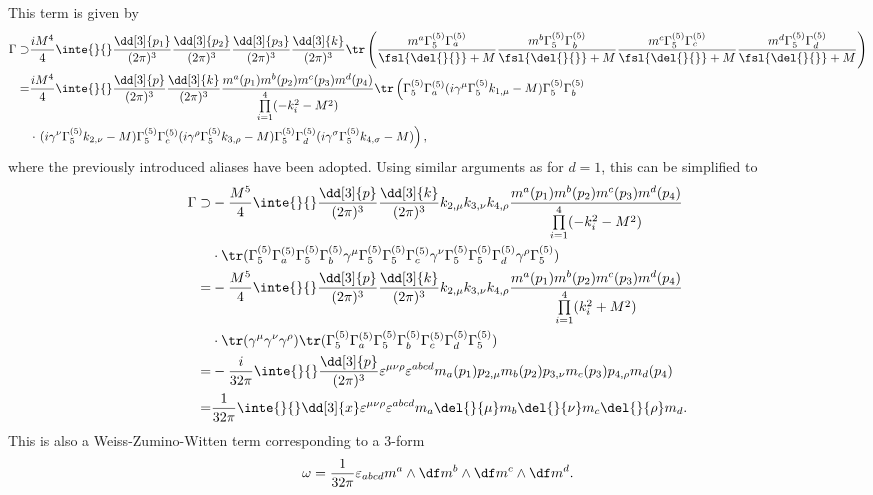 This term is given by
\begin{align*}
\Gamma \supset& \frac{iM^{4}}{4}\inte{}{}\frac{\dd[3]{p_{1}}}{(2\pi)^{3}}\frac{\dd[3]{p_{2}}}{(2\pi)^{3}}\frac{\dd[3]{p_{3}}}{(2\pi)^{3}}\frac{\dd[3]{k}}{(2\pi)^{3}}\tr\left(\frac{m^{a}\Gamma_{5}^{(5)}\Gamma_{a}^{(5)}}{\fsl{\del{}{}} + M}\frac{m^{b}\Gamma_{5}^{(5)}\Gamma_{b}^{(5)}}{\fsl{\del{}{}} + M}\frac{m^{c}\Gamma_{5}^{(5)}\Gamma_{c}^{(5)}}{\fsl{\del{}{}} + M}\frac{m^{d}\Gamma_{5}^{(5)}\Gamma_{d}^{(5)}}{\fsl{\del{}{}} + M}\right) \\
=& \frac{iM^{4}}{4}\inte{}{}\frac{\dd[3]{p}}{(2\pi)^{3}}\frac{\dd[3]{k}}{(2\pi)^{3}}\frac{m^{a}(p_{1})m^{b}(p_{2})m^{c}(p_{3})m^{d}(p_{4})}{\prod\limits_{i = 1}^{4}(-k_{i}^{2} - M^{2})}\tr\left(\Gamma_{5}^{(5)}\Gamma_{a}^{(5)}(i\gamma^{\mu}\Gamma_{5}^{(5)}k_{1, \mu} - M)\Gamma_{5}^{(5)}\Gamma_{b}^{(5)} \right. \\
&\cdot \left. (i\gamma^{\nu}\Gamma_{5}^{(5)}k_{2, \nu} - M)\Gamma_{5}^{(5)}\Gamma_{c}^{(5)}(i\gamma^{\rho}\Gamma_{5}^{(5)}k_{3, \rho} - M)\Gamma_{5}^{(5)}\Gamma_{d}^{(5)}(i\gamma^{\sigma}\Gamma_{5}^{(5)}k_{4, \sigma} - M)\right),
\end{align*}
where the previously introduced aliases have been adopted. Using similar arguments as for $d = 1$, this can be simplified to
\begin{align*}
	\Gamma \supset& -\frac{M^{5}}{4}\inte{}{}\frac{\dd[3]{p}}{(2\pi)^{3}}\frac{\dd[3]{k}}{(2\pi)^{3}}k_{2, \mu}k_{3, \nu}k_{4, \rho}\frac{m^{a}(p_{1})m^{b}(p_{2})m^{c}(p_{3})m^{d}(p_{4})}{\prod\limits_{i = 1}^{4}(-k_{i}^{2} - M^{2})} \\
&\cdot\tr(\Gamma_{5}^{(5)}\Gamma_{a}^{(5)}\Gamma_{5}^{(5)}\Gamma_{b}^{(5)}\gamma^{\mu}\Gamma_{5}^{(5)}\Gamma_{5}^{(5)}\Gamma_{c}^{(5)}\gamma^{\nu}\Gamma_{5}^{(5)}\Gamma_{5}^{(5)}\Gamma_{d}^{(5)}\gamma^{\rho}\Gamma_{5}^{(5)}) \\
=& -\frac{M^{5}}{4}\inte{}{}\frac{\dd[3]{p}}{(2\pi)^{3}}\frac{\dd[3]{k}}{(2\pi)^{3}}k_{2, \mu}k_{3, \nu}k_{4, \rho}\frac{m^{a}(p_{1})m^{b}(p_{2})m^{c}(p_{3})m^{d}(p_{4})}{\prod\limits_{i = 1}^{4}(k_{i}^{2} + M^{2})} \\
&\cdot\tr(\gamma^{\mu}\gamma^{\nu}\gamma^{\rho})\tr(\Gamma_{5}^{(5)}\Gamma_{a}^{(5)}\Gamma_{5}^{(5)}\Gamma_{b}^{(5)}\Gamma_{c}^{(5)}\Gamma_{d}^{(5)}\Gamma_{5}^{(5)}) \\
=& -\frac{i}{32\pi}\inte{}{}\frac{\dd[3]{p}}{(2\pi)^{3}}\varepsilon^{\mu\nu\rho}\varepsilon^{abcd}m_{a}(p_{1})p_{2, \mu}m_{b}(p_{2})p_{3, \nu}m_{c}(p_{3})p_{4, \rho}m_{d}(p_{4}) \\
=& \frac{1}{32\pi}\inte{}{}\dd[3]{x}\varepsilon^{\mu\nu\rho}\varepsilon^{abcd}m_{a}\del{}{\mu}m_{b}\del{}{\nu}m_{c}\del{}{\rho}m_{d}.
\end{align*}
This is also a Weiss-Zumino-Witten term corresponding to a $3$-form
\begin{align*}
	\omega = \frac{1}{32\pi}\varepsilon_{abcd}m^{a}\wedge\df m^{b}\wedge\df m^{c}\wedge\df m^{d}.
\end{align*}

